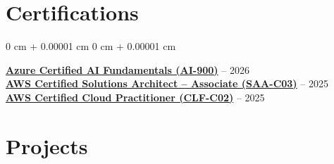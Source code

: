 \documentclass[10pt, letterpaper]{article}
\newenvironment{onecolentry}{
    \begin{adjustwidth}{
        0 cm + 0.00001 cm
    }{
        0 cm + 0.00001 cm
    }
}{
    \end{adjustwidth}
} %
\begin{document}
\section{Certifications}

\begin{onecolentry}
\href{https://learn.microsoft.com/api/credentials/share/en-gb/RahulVaranasi-3218/1F7372AD421B4DB5?sharingId=E9C3F05C31D251C8}{\textbf{Azure Certified AI Fundamentals (AI-900)}} – 2026 \\
\href{https://www.credly.com/badges/5210018b-e5c4-4508-bc97-256006bb29d3/public_url}{\textbf{AWS Certified Solutions Architect – Associate (SAA-C03)}} – 2025 \\
\href{https://www.credly.com/badges/ecc1b451-4159-44c0-9e34-29c33c1e2a4b/public_url}{\textbf{AWS Certified Cloud Practitioner (CLF-C02)}} – 2025 

\end{onecolentry}


    \section{Projects}
    
\end{document}

